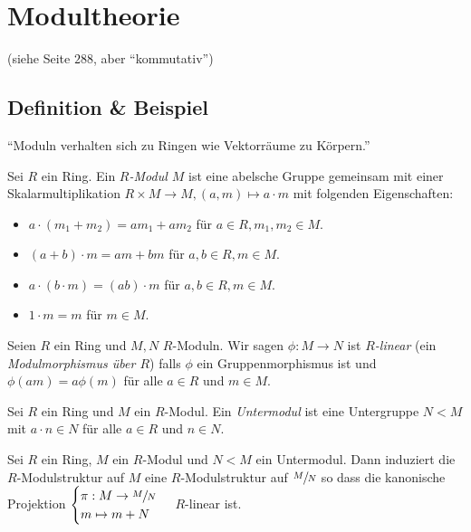 \graphicspath{{Images/}}

\chapter{Modultheorie}
(siehe Seite $288$, aber \enquote{kommutativ})

\section{Definition \& Beispiel}
\enquote{Moduln verhalten sich zu Ringen wie Vektorräume zu Körpern.}

\begin{definition}
	Sei $R$ ein Ring. Ein \emph{$R$-Modul $M$} ist eine abelsche Gruppe gemeinsam mit einer Skalarmultiplikation $R \times M \to M, (a,m) \mapsto a \cdot m$
	mit folgenden Eigenschaften:
	\begin{itemize}
		\item $a \cdot (m_1 + m_2) = a m_1 + a m_2$ für $a \in R, m_1,m_2 \in M$.
		\item $(a+b) \cdot m = a m + b m$ für $a,b \in R, m \in M$.
		\item $a \cdot (b \cdot m) = (a b ) \cdot m$ für $a,b \in R, m \in M$.
		\item $1 \cdot m = m$ für $m \in M$.
	\end{itemize}
\end{definition}

\begin{definition}
	Seien $R$ ein Ring und $M,N$ $R$-Moduln. Wir sagen $\phi: M \to N$ ist \emph{$R$-linear} (ein \emph{Modulmorphismus über $R$})
	falls $\phi$ ein Gruppenmorphismus ist und $\phi(a m) = a \phi(m)$ für alle $a \in R$ und $m \in M$.
\end{definition}

\begin{definition}
	Sei $R$ ein Ring und $M$ ein $R$-Modul. Ein \emph{Untermodul} ist eine Untergruppe $N < M$ mit $a \cdot n \in N$ für alle $a \in R$ und $n \in N$.
\end{definition}

\begin{lemma}
	Sei $R$ ein Ring, $M$ ein $R$-Modul und $N < M$ ein Untermodul. Dann induziert die $R$-Modulstruktur auf $M$ eine $R$-Modulstruktur auf $\sfrac{M}{N}$ so dass
	die kanonische Projektion $\begin{cases}
		\pi: M \to \sfrac{M}{N}\\ m \mapsto m+N
	\end{cases}$ $R$-linear ist.
\end{lemma}



